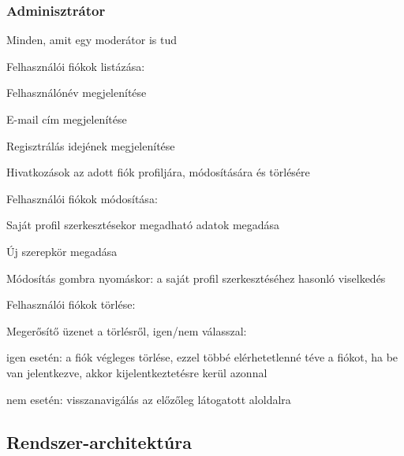 \subsubsection{Adminisztrátor}
\begin{compactitem}
	\item Minden, amit egy moderátor is tud
	\item Felhasználói fiókok listázása:
	\begin{compactitem}
		\item Felhasználónév megjelenítése
		\item E-mail cím megjelenítése
		\item Regisztrálás idejének megjelenítése
		\item Hivatkozások az adott fiók profiljára, módosítására és törlésére
	\end{compactitem}
	\item Felhasználói fiókok módosítása:
	\begin{compactitem}
		\item Saját profil szerkesztésekor megadható adatok megadása
		\item Új szerepkör megadása
		\item Módosítás gombra nyomáskor: a saját profil szerkesztéséhez hasonló viselkedés
	\end{compactitem}
	\item Felhasználói fiókok törlése:
	\begin{compactitem}
		\item Megerősítő üzenet a törlésről, igen/nem válasszal:
		\begin{compactitem}
			\item igen esetén: a fiók végleges törlése, ezzel többé elérhetetlenné téve a fiókot, ha be van jelentkezve, akkor kijelentkeztetésre kerül azonnal
			\item nem esetén: visszanavigálás az előzőleg látogatott aloldalra
		\end{compactitem}
	\end{compactitem}
\end{compactitem}

\subsection{Rendszer-architektúra}

